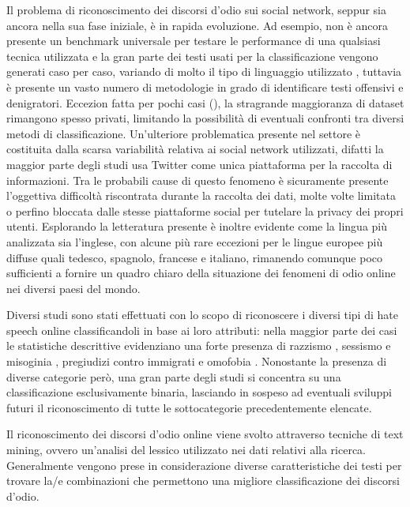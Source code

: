 Il problema di riconoscimento dei discorsi d'odio sui social network, seppur sia ancora nella sua fase iniziale, è in rapida evoluzione. Ad esempio, non è ancora presente un benchmark universale per testare le performance di una qualsiasi tecnica utilizzata e la gran parte dei testi usati per la classificazione vengono generati caso per caso, variando di molto il tipo di linguaggio utilizzato \cite{hatespeechSurvey}, tuttavia è presente un vasto numero di metodologie in grado di identificare testi offensivi e denigratori. Eccezion fatta per pochi casi (\cite{fersES,HateData1,HateData2,HateData3,HateData4}), la stragrande maggioranza di dataset rimangono spesso privati, limitando la possibilità di eventuali confronti tra diversi metodi di classificazione.
Un’ulteriore problematica presente nel settore è costituita dalla scarsa variabilità relativa ai social network utilizzati, difatti la maggior parte degli studi usa Twitter come unica piattaforma per la raccolta di informazioni. Tra le probabili cause di questo fenomeno è sicuramente presente l'oggettiva difficoltà riscontrata durante la raccolta dei dati, molte volte limitata o perfino bloccata dalle stesse piattaforme social per tutelare la privacy dei propri utenti. Esplorando la letteratura presente è inoltre evidente come la lingua più analizzata sia l’inglese, con alcune più rare eccezioni per le lingue europee più diffuse quali tedesco, spagnolo, francese e italiano, rimanendo comunque poco sufficienti a fornire un quadro chiaro della situazione dei fenomeni di odio online nei diversi paesi del mondo.

Diversi studi sono stati effettuati con lo scopo di riconoscere i diversi tipi di hate speech online classificandoli in base ai loro attributi: nella maggior parte dei casi le statistiche descrittive evidenziano una forte presenza di razzismo \cite{LocateHate}, sessismo e misoginia \cite{SarahMiso,fersES,JamieMiso}, pregiudizi contro immigrati \cite{rnnabusive} e omofobia \cite{VasuHomophobia}. Nonostante la presenza di diverse categorie però, una gran parte degli studi si concentra su una classificazione esclusivamente binaria, lasciando in sospeso ad eventuali sviluppi futuri il riconoscimento di tutte le sottocategorie precedentemente elencate.


Il riconoscimento dei discorsi d’odio online viene svolto attraverso tecniche di text mining, ovvero un'analisi del lessico utilizzato nei dati relativi alla ricerca. Generalmente vengono prese in considerazione diverse caratteristiche dei testi per trovare la/e combinazioni che permettono una migliore classificazione dei discorsi d’odio.


